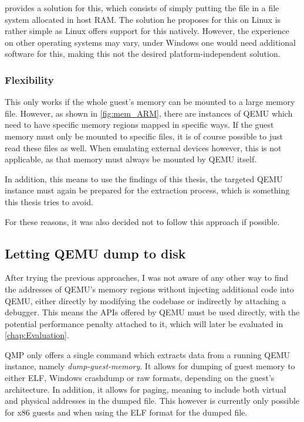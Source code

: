  provides a solution for this,
which consists of simply putting the file in a file system allocated in host RAM.
The solution he proposes for this on Linux is rather simple as Linux offers support for this natively.
However, the experience on other operating systems may vary, under Windows one would need additional software for this,
making this not the desired platform-independent solution.

\subsubsection{Flexibility}
This only works if the whole guest's memory can be mounted to a large memory file.
However, as shown in \autoref{fig:mem_ARM},
there are instances of QEMU which need to have specific memory regions mapped in specific ways.
If the guest memory must only be mounted to specific files,
it is of course possible to just read these files as well.
When emulating external devices however,
this is not applicable, as that memory must always be mounted by QEMU itself.

In addition, this means to use the findings of this thesis,
the targeted QEMU instance must again be prepared for the extraction process,
which is something this thesis tries to avoid.

For these reasons, it was also decided not to follow this approach if possible.

\subsection{Letting QEMU dump to disk}\label{sec:resignation}
After trying the previous approaches,
I was not aware of any other way to find the addresses of QEMU's memory regions
without injecting additional code into QEMU,
either directly by modifying the codebase or indirectly by attaching a debugger.
This means the APIs offered by QEMU must be used directly,
with the potential performance penalty attached to it,
which will later be evaluated in \autoref{chap:Evaluation}.

QMP only offers a single command which extracts data from a running QEMU instance,
namely \emph{dump-guest-memory}.
It allows for dumping of guest memory to either ELF, Windows crashdump or raw formats,
depending on the guest's architecture.
In addition, it allows for paging, meaning to include both virtual and physical addresses in the dumped file.
This however is currently only possible for x86 guests and when using the ELF format for the dumped file.

